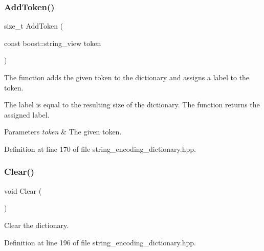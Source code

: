 \subsubsection{Add\+Token()}
{\footnotesize\ttfamily size\+\_\+t Add\+Token (\begin{DoxyParamCaption}\item[{const boost\+::string\+\_\+view}]{token }\end{DoxyParamCaption})\hspace{0.3cm}{\ttfamily [inline]}}



The function adds the given token to the dictionary and assigns a label to the token. 

The label is equal to the resulting size of the dictionary. The function returns the assigned label.


\begin{DoxyParams}{Parameters}
{\em token} & The given token. \\
\hline
\end{DoxyParams}


Definition at line 170 of file string\+\_\+encoding\+\_\+dictionary.\+hpp.

\mbox{\label{classmlpack_1_1data_1_1StringEncodingDictionary_3_01boost_1_1string__view_01_4_aa71d36872f416feaa853788a7a7a7ef8}} 
\subsubsection{Clear()}
{\footnotesize\ttfamily void Clear (\begin{DoxyParamCaption}{ }\end{DoxyParamCaption})\hspace{0.3cm}{\ttfamily [inline]}}



Clear the dictionary. 



Definition at line 196 of file string\+\_\+encoding\+\_\+dictionary.\+hpp.

\mbox{\label{classmlpack_1_1data_1_1StringEncodingDictionary_3_01boost_1_1string__view_01_4_a525507684140c7199a299e693eeb4394}} 
